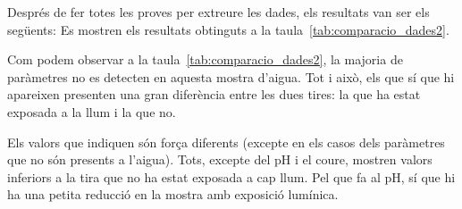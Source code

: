 Després de fer totes les proves per extreure les dades, els resultats van ser els següents:
Es mostren els resultats obtinguts a la taula~\ref{tab:comparacio_dades2}.


\begin{table}[H]
\centering
{}
\caption{Resultats del segon experiment}
\label{tab:comparacio_dades2}
\end{table}
\vspace*{-0.5truecm}
Com podem observar a la taula~\ref{tab:comparacio_dades2}, la majoria de paràmetres no es detecten en aquesta mostra d’aigua. Tot i això, els que sí que hi apareixen presenten una gran diferència entre les dues tires: la que ha estat exposada a la llum i la que no.

Els valors que indiquen són força diferents (excepte en els casos dels paràmetres que no són presents a l’aigua). Tots, excepte del pH i el coure, mostren valors inferiors a la tira que no ha estat exposada a cap llum. Pel que fa al pH, sí que hi ha una petita reducció en la mostra amb exposició lumínica.

